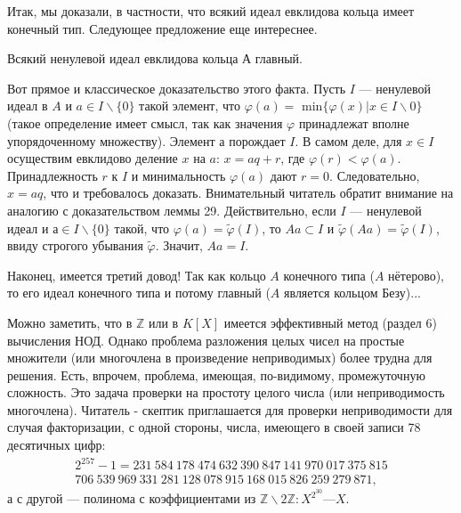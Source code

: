 \documentclass{mai_book}
\begin{document}
Итак, мы доказали, в частности, что всякий идеал евклидова кольца имеет конечный тип. Следующее предложение еще интереснее.

\begin{predl}
\hspace*{0.5cm}Всякий ненулевой идеал евклидова кольца А главный.
\end{predl}

\begin{myproof}
Вот прямое и классическое доказательство этого факта. Пусть 
$I$ — ненулевой идеал в $A$ и $a \in I \backslash \{0\}$ такой элемент, что 
$\varphi(a) =$ min$\{\varphi(x) | x \in I \backslash 0\}$ (такое определение имеет смысл, так 
как значения $\varphi$ принадлежат вполне упорядоченному множеству). 
Элемент $а$ порождает $I$. В самом деле, для $x \in I$ осуществим  
евклидово деление $x$ на $a$: $x = aq + r$, где $\varphi(r) < \varphi(a)$. Принадлежность $r$ 
к $I$ и минимальность $\varphi(a)$ дают $r = 0$. Следовательно, $x = aq$, что 
и требовалось доказать.\newline 
Внимательный читатель обратит внимание на аналогию с  
доказательством леммы 29. Действительно, если $I$ — ненулевой идеал и 
$ а \in I\backslash \{0\}$ такой, что $\varphi(a) = \tilde{\varphi}(I)$, то $Aa \subset I$ и $\tilde{\varphi}(Aa) = \tilde{\varphi}(I)$, ввиду 
 строгого убывания $\tilde{\varphi}$. Значит, $Aa = I$.\newline
\newpage


\noindent Наконец, имеется третий довод! Так как кольцо $A$ конечного  
типа ($A$ нётерово), то его идеал конечного типа и потому главный 
($A$ является кольцом Безу)... 
\end{myproof}

\begin{mynotice}
Можно заметить, что в $\mathbb{Z}$ или в $K[X]$ имеется  
эффективный метод (раздел 6) вычисления НОД. Однако  
проблема разложения целых чисел на простые множители (или  
многочлена в произведение неприводимых) более трудна для решения. 
Есть, впрочем, проблема, имеющая, по-видимому,  
промежуточную сложность. Это задача проверки на простоту целого числа 
(или неприводимость многочлена). Читатель - скептик  
приглашается для проверки неприводимости для случая факторизации, 
с одной стороны, числа, имеющего в своей записи 78 десятичных 
цифр:
\begin{multline*}
2^{257} - 1 = 231\: 584\: 178\: 474\: 632\: 390\: 847\: 141\: 970\: 017\: 375\: 815\\ 
706\: 539\: 969\: 331\: 281\: 128\: 078\: 915\: 168\: 015\: 826\: 259\: 279\: 871,
\end{multline*} 
а с другой — полинома с коэффициентами из $\mathbb{Z}\backslash2\mathbb{Z} : X^{2^{30}} — X$. 
\end{mynotice}
\setcounter{section}{3}
\end{document}
